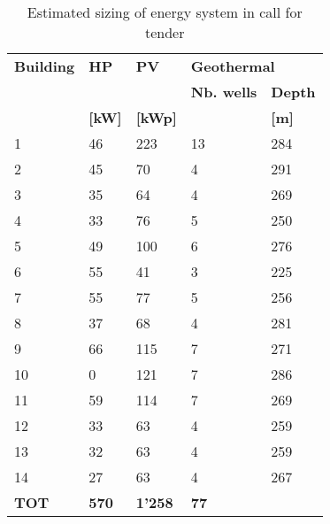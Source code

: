 \begin{table}[h!]
\centering
\caption{Estimated sizing of energy system in call for tender}\vspace{2mm}
\label{tab:ppa_prestudy} 
\begin{tabular}{lllll}
\toprule
\textbf{Building} & \textbf{HP}    & \textbf{PV}    & \multicolumn{2}{l}{\textbf{Geothermal}} \\
         &       &       & \textbf{Nb. wells}        & \textbf{Depth}        \\
         & \textbf{[kW]} & \textbf{[kWp] } &                 & \textbf{[m] }         \\
         \midrule
1        & 46    & 223   & 13              & 284          \\
2        & 45    & 70    & 4               & 291          \\
3        & 35    & 64    & 4               & 269          \\
4        & 33    & 76    & 5               & 250          \\
5        & 49    & 100   & 6               & 276          \\
6        & 55    & 41    & 3               & 225          \\
7        & 55    & 77    & 5               & 256          \\
8        & 37    & 68    & 4               & 281          \\
9        & 66    & 115   & 7               & 271          \\
10       & 0     & 121   & 7               & 286          \\
11       & 59    & 114   & 7               & 269          \\
12       & 33    & 63    & 4               & 259          \\
13       & 32    & 63    & 4               & 259          \\
14       & 27    & 63    & 4               & 267          \\
\midrule
\textbf{TOT}      & \textbf{570}   & \textbf{1'258} & \textbf{77}              &             \\
\bottomrule
\end{tabular}
\end{table}